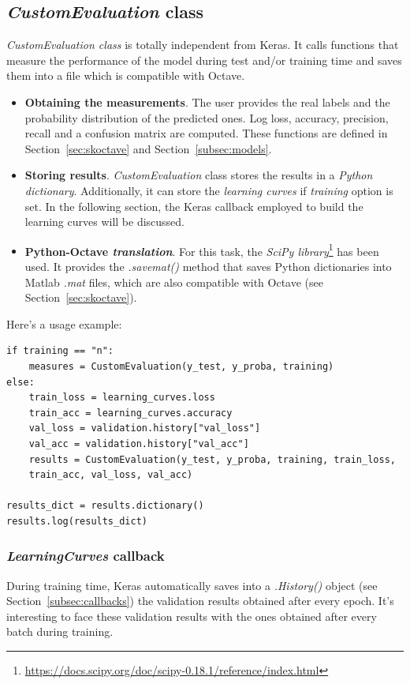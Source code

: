 \subsection{\textit{CustomEvaluation} class}
\emph{\textit{CustomEvaluation} class} is totally independent from Keras. It calls functions that measure the performance of the model during test and/or training time and saves them into a file which is compatible with Octave.
\begin{itemize}
	\item \textbf{Obtaining the measurements}. The user provides the real labels and the probability distribution of the predicted ones. Log loss, accuracy, precision, recall and a confusion matrix are computed. These functions are defined in Section~\ref{sec:skoctave} and Section~\ref{subsec:models}.
	\item \textbf{Storing results}. \textit{CustomEvaluation} class stores the results in a \emph{Python dictionary}. Additionally, it can store the \emph{learning curves} if \textit{training} option is set. In the following section, the Keras callback employed to build the learning curves will be discussed.
	\item \textbf{Python-Octave \textit{translation}}. For this task, the \emph{SciPy library}\footnote{\url{https://docs.scipy.org/doc/scipy-0.18.1/reference/index.html}} has been used. It provides the \textit{.savemat()} method that saves Python dictionaries into Matlab \textit{.mat} files, which are also compatible with Octave (see Section~\ref{sec:skoctave}).
\end{itemize}

Here's a usage example:
\begin{lstlisting}
if training == "n":
	measures = CustomEvaluation(y_test, y_proba, training)
else:
	train_loss = learning_curves.loss
	train_acc = learning_curves.accuracy
	val_loss = validation.history["val_loss"]
	val_acc = validation.history["val_acc"]
	results = CustomEvaluation(y_test, y_proba, training, train_loss,
	train_acc, val_loss, val_acc)

results_dict = results.dictionary()
results.log(results_dict)
\end{lstlisting}

\subsubsection{\textit{LearningCurves} callback} \label{subsubsec:learningcurves}
During training time, Keras automatically saves into a \textit{.History()} object (see Section~\ref{subsec:callbacks}) the validation results obtained after every epoch. It's interesting to face these validation results with the ones obtained after every batch during training.

